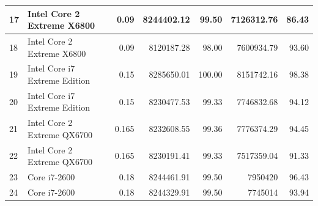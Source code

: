 \documentclass{beamer}
\newcommand{\comment}[1]{}
\begin{document}
\begin{frame}
\begin{table}[h]
{\begin{tabular}{|l|l|r|r|r|r|r|}
17	&	Intel Core 2 Extreme X6800	&	0.09	&	8244402.12	&	99.50	&	7126312.76	&	86.43	\\	\hline
18	&	Intel Core 2 Extreme X6800	&	0.09	&	8120187.28	&	98.00	&	7600934.79	&	93.60	\\	\hline
19	&	Intel Core i7 Extreme Edition	&	0.15	&	8285650.01	&	100.00	&	8151742.16	&	98.38	\\	\hline
20	&	Intel Core i7 Extreme Edition	&	0.15	&	8230477.53	&	99.33	&	7746832.68	&	94.12	\\	\hline
21	&	Intel Core 2 Extreme QX6700	&	0.165	&	8232608.55	&	99.36	&	7776374.29	&	94.45	\\	\hline
22	&	Intel Core 2 Extreme QX6700	&	0.165	&	8230191.41	&	99.33	&	7517359.04	&	91.33	\\	\hline
23	&	Core i7-2600	&	0.18	&	8244461.91	&	99.50	&	7950420	&	96.43	\\	\hline
24	&	Core i7-2600	&	0.18	&	8244329.91	&	99.50	&	7745014	&	93.94	\\	\hline
\end{tabular}
}
\label{case5sha24}
\end{table}
\end{frame}


\comment{
\begin{frame}
 \frametitle{ISRO Bio-Diversity Dataset}
\begin{figure}[t]
	\centering
	\subfigure[]
	{
		\texttt{[image: Category1.png]}
		\label{fig:cata}
	}
	\subfigure[]
	{
		\texttt{[image: Category2.png]}
		\label{fig:catb}
	}
	\subfigure[]
	{
		\texttt{[image: Category4.png]}
		\label{fig:catc}
	}
	\subfigure[]
	{
		\texttt{[image: Category5.png]}
		\label{fig:catd}
	}
	\caption{Categories of the mined subgraphs.}
	\label{fig:category}
\end{figure}
\end{frame}

}
\end{document}
